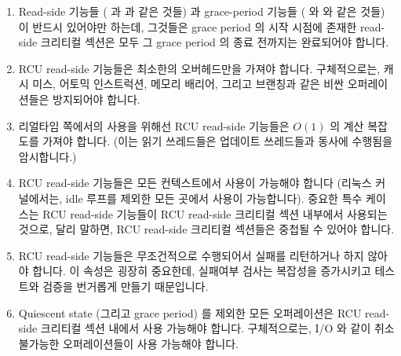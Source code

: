 \begin{enumerate}
\item	Read-side 기능들 ( 과  과
	같은 것들) 과 grace-period 기능들 ( 와
	 와 같은 것들) 이 반드시 있어야만 하는데, 그것들은 grace
	period 의 시작 시점에 존재한 read-side 크리티컬 섹션은 모두 그 grace
	period 의 종료 전까지는 완료되어야 합니다.
\item	RCU read-side 기능들은 최소한의 오버헤드만을 가져야 합니다.
	구체적으로는, 캐시 미스, 어토믹 인스트럭션, 메모리 배리어, 그리고
	브랜칭과 같은 비싼 오퍼레이션들은 방지되어야 합니다.
\item	리얼타임 쪽에서의 사용을 위해선 RCU read-side 기능들은
	$O\left(1\right)$ 의 계산 복잡도를 가져야 합니다.
	(이는 읽기 쓰레드들은 업데이트 쓰레드들과 동사에 수행됨을 암시합니다.)
\iffalse

\item	There must be read-side primitives (such as \co{rcu_read_lock()}
	and \co{rcu_read_unlock()}) and grace-period primitives
	(such as \co{synchronize_rcu()} and \co{call_rcu()}), such
	that any RCU read-side critical section in existence at the
	start of a grace period has completed by the end of the
	grace period.
\item	RCU read-side primitives should have minimal overhead.
	In particular, expensive operations such as cache misses,
	atomic instructions, memory barriers, and branches should
	be avoided.
\item	RCU read-side primitives should have $O\left(1\right)$ computational
	complexity to enable real-time use.
	(This implies that readers run concurrently with updaters.)
\fi
\item	RCU read-side 기능들은 모든 컨텍스트에서 사용이 가능해야 합니다
	(리눅스 커널에서는, idle 루프를 제외한 모든 곳에서 사용이 가능합니다).
	중요한 특수 케이스는 RCU read-side 기능들이 RCU read-side 크리티컬 섹션
	내부에서 사용되는 것으로, 달리 말하면, RCU read-side 크리티컬 섹션들은
	중첩될 수 있어야 합니다.
\item	RCU read-side 기능들은 무조건적으로 수행되어서 실패를 리턴하거나 하지
	않아야 합니다.
	이 속성은 굉장히 중요한데, 실패여부 검사는 복잡성을 증가시키고 테스트와
	검증을 번거롭게 만들기 때문입니다.
\item	Quiescent state (그리고 grace period) 를 제외한 모든 오퍼레이션은 RCU
	read-side 크리티컬 섹션 내에서 사용 가능해야 합니다.
	구체적으로는, I/O 와 같이 취소 불가능한 오퍼레이션들이 사용 가능해야
	합니다.
\iffalse


\end{enumerate}

